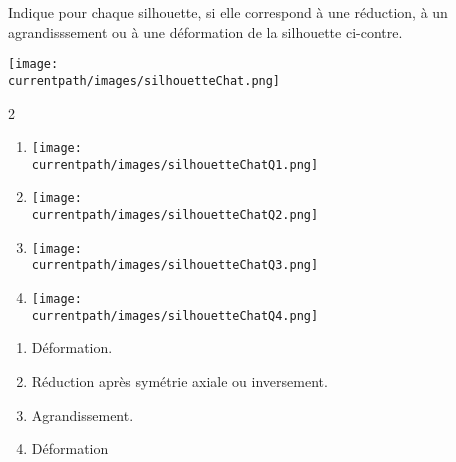 \begin{exercice*}
    \phantom{rrr}

    \begin{minipage}{0.7\linewidth}
    Indique pour chaque silhouette, si elle correspond à une réduction, à un agrandisssement ou à une déformation de la silhouette ci-contre.
    \end{minipage}
    \begin{minipage}{0.25\linewidth}
        \texttt{[image: \\currentpath/images/silhouetteChat.png]}
    \end{minipage}

    \begin{minipage}{1\linewidth}
    \begin{center}
        \begin{multicols}2   
            \begin{enumerate}
                \item \phantom{rrr} 
                
                \texttt{[image: \\currentpath/images/silhouetteChatQ1.png]}
                \item \phantom{rrr} 
                
                \texttt{[image: \\currentpath/images/silhouetteChatQ2.png]}
                \item \phantom{rrr} 
                
                \texttt{[image: \\currentpath/images/silhouetteChatQ3.png]}
                \item \phantom{rrr} 
                
                \texttt{[image: \\currentpath/images/silhouetteChatQ4.png]}
            \end{enumerate}
        \end{multicols}
    \end{center}
    \end{minipage}
    
\end{exercice*}
\begin{corrige}

    \begin{enumerate}
        \item Déformation.                
        \item Réduction après symétrie axiale ou inversement.
        \item Agrandissement.
        \item Déformation                
    \end{enumerate}
\end{corrige}

